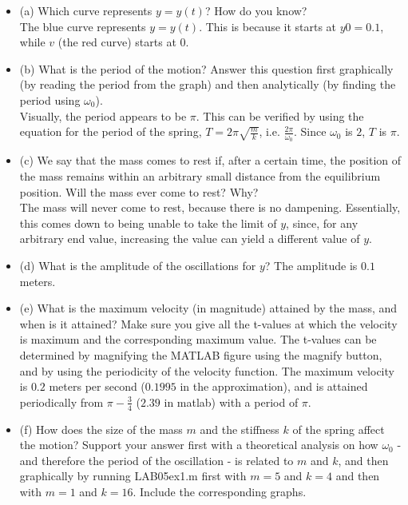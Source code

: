 \solution
\begin{itemize}

\item (a) Which curve represents $y = y(t)$? How do you know? \\ 
    The blue curve represents $y = y(t)$. This is because it starts at $y0 = 0.1$, while $v$ (the red curve) starts at $0$.
\item (b) What is the period of the motion? Answer this question first graphically (by reading the period from the graph) and then analytically (by finding the period using $\omega_0$). \\
    Visually, the period appears to be $\pi$. This can be verified by using the equation for the period of the spring, $T=2\pi \sqrt{\frac{m}{k}}$, i.e. $\frac{2\pi}{\omega_0}$. Since $\omega_0$ is $2$, $T$ is $\pi$.
\item (c) We say that the mass comes to rest if, after a certain time, the position of the mass remains within an arbitrary small distance from the equilibrium position. Will the mass ever come to
rest? Why? \\
The mass will never come to rest, because there is no dampening. Essentially, this comes down to being unable to take the limit of $y$, since, for any arbitrary end value, increasing the value can yield a different value of $y$.
\item (d) What is the amplitude of the oscillations for $y$?
    The amplitude is $0.1$ meters.
\item (e) What is the maximum velocity (in magnitude) attained by the mass, and when is it attained?  Make sure you give all the t-values at which the velocity is maximum and the corresponding maximum value. The t-values can be determined by magnifying the MATLAB figure using the magnify button, and by using the periodicity of the velocity function.
    The maximum velocity is $0.2$ meters per second ($0.1995$ in the approximation), and is attained periodically from $\pi - \frac{3}{4}$ ($2.39$ in matlab) with a period of $\pi$.
\item (f) How does the size of the mass $m$ and the stiffness $k$ of the spring affect the motion?  Support your answer first with a theoretical analysis on how $\omega_0$ - and therefore the period of the oscillation - is related to $m$ and $k$, and then graphically by running LAB05ex1.m first with $m = 5$ and $k = 4$ and then with $m = 1$ and $k = 16$. Include the corresponding graphs.

\end{itemize}
